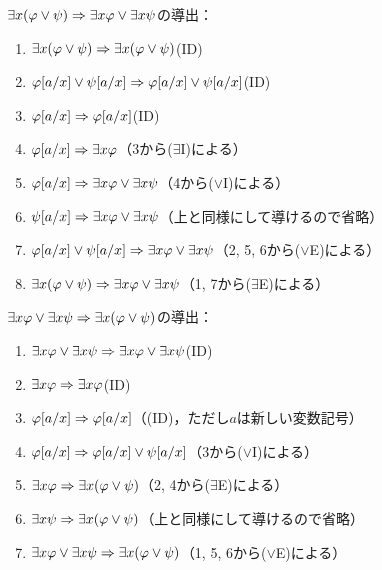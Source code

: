 \(\exists x \paren{\varphi \lor \psi} \sequent \exists x \varphi \lor \exists x \psi\)の導出：
\begin{enumerate}
	\item \(\exists x \paren{\varphi \lor \psi} \sequent \exists x \paren{\varphi \lor \psi}\)\quad (ID)
	\item \(\subst{\varphi}{a/x} \lor \subst{\psi}{a/x} \sequent \subst{\varphi}{a/x} \lor \subst{\psi}{a/x}\)\quad (ID)
	\item \(\subst{\varphi}{a/x} \sequent \subst{\varphi}{a/x}\)\quad (ID)
	\item \(\subst{\varphi}{a/x} \sequent \exists x \varphi\)\quad （3から(\(\exists\)I)による）
	\item \(\subst{\varphi}{a/x} \sequent \exists x \varphi \lor \exists x \psi\)\quad （4から(\(\lor\)I)による）
	\item \(\subst{\psi}{a/x} \sequent \exists x \varphi \lor \exists x \psi\)\quad （上と同様にして導けるので省略）
	\item \(\subst{\varphi}{a/x} \lor \subst{\psi}{a/x} \sequent \exists x \varphi \lor \exists x \psi\)\quad （2, 5, 6から(\(\lor\)E)による）
	\item \(\exists x \paren{\varphi \lor \psi} \sequent \exists x \varphi \lor \exists x \psi\)\quad （1, 7から(\(\exists\)E)による）
\end{enumerate}

\(\exists x \varphi \lor \exists x \psi \sequent \exists x \paren{\varphi \lor \psi}\)の導出：
\begin{enumerate}
	\item \(\exists x \varphi \lor \exists x \psi \Rightarrow \exists x \varphi \lor \exists x \psi\)\quad (ID)
	\item \(\exists x \varphi \Rightarrow \exists x \varphi\)\quad (ID)
	\item \(\subst{\varphi}{a/x} \sequent \subst{\varphi}{a/x}\)\quad （(ID)，ただし\(a\)は新しい変数記号）
	\item \(\subst{\varphi}{a/x} \sequent \subst{\varphi}{a/x} \lor \subst{\psi}{a/x}\)\quad （3から(\(\lor\)I)による）
	\item \(\exists x \varphi \sequent \exists x \paren{\varphi \lor \psi}\)\quad （2, 4から(\(\exists\)E)による）
	\item \(\exists x \psi \sequent \exists x \paren{\varphi \lor \psi}\)\quad （上と同様にして導けるので省略）
	\item \(\exists x \varphi \lor \exists x \psi \sequent \exists x \paren{\varphi \lor \psi}\)\quad （1, 5, 6から(\(\lor\)E)による）
\end{enumerate}

